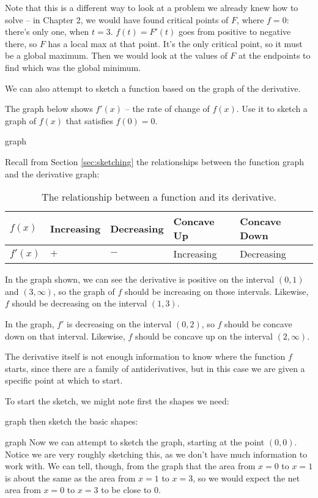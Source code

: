 \begin{theorem}
Note that this is a different way to look at a problem we already knew how to solve – in Chapter 2, we would have found critical points of $F$, where $f=0$: there's only one, when $t=3$. $f(t)=F'(t)$ goes from positive to negative there, so $F$ has a local max at that point. It's the only critical point, so it must be a global maximum. Then we would look at the values of $F$ at the endpoints to find which was the global minimum.

We can also attempt to sketch a function based on the graph of the derivative.

\begin{example}
The graph below shows $f'(x)$ – the rate of change of $f(x)$. Use it to sketch a graph of $f(x)$ that satisfies $f(0)=0$.

graph
\begin{solution}
Recall from Section \ref{sec:sketching} the relationships between the function graph and the derivative graph:
\begin{table}[ht!]
    \centering
    \begin{tabular}{*{5}{l}}
    \toprule
    $f(x)$ &	Increasing &	Decreasing &	Concave Up &	Concave Down	\\
    \midrule
    $f'(x)$	& $+$ & $-$ &	Increasing & Decreasing \\
    \bottomrule
    \end{tabular}
    \caption{The relationship between a function and its derivative.}
    \label{tab:5-derivs}
\end{table}

In the graph shown, we can see the derivative is positive on the interval $(0, 1)$ and $(3,\infty)$, so the graph of $f$ should be increasing on those intervals. Likewise, $f$ should be decreasing on the interval $(1,3)$.

In the graph, $f'$ is decreasing on the interval $(0, 2)$, so $f$ should be concave down on that interval. Likewise, $f$ should be concave up on the interval $(2,\infty)$.

The derivative itself is not enough information to know where the function $f$ starts, since there are a family of antiderivatives, but in this case we are given a specific point at which to start.

To start the sketch, we might note first the shapes we need:

graph
then sketch the basic shapes:

graph
Now we can attempt to sketch the graph, starting at the point $(0, 0)$. Notice we are very roughly sketching this, as we don't have much information to work with. We can tell, though, from the graph that the area from $x=0$ to $x=1$ is about the same as the area from $x=1$ to $x=3$, so we would expect the net area from $x=0$ to $x=3$ to be close to 0.


\end{solution}
\end{example}
\end{theorem}
